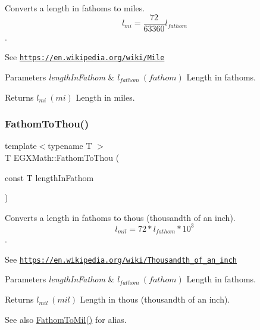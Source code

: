 Converts a length in fathoms to miles. \[ l_{mi}=\frac{72}{63360} l_{fathom} \]. 

See \href{https://en.wikipedia.org/wiki/Mile}{\tt https\+://en.\+wikipedia.\+org/wiki/\+Mile} 
\begin{DoxyParams}{Parameters}
{\em length\+In\+Fathom} & $ l_{fathom}\ (fathom)$ Length in fathoms. \\
\hline
\end{DoxyParams}
\begin{DoxyReturn}{Returns}
$ l_{mi}\ (mi)$ Length in miles. 
\end{DoxyReturn}
\mbox{\label{group___e_g_x_math-_conversions-_length_conversions-_nautical-_fathom-_imperial_ga869f851e88866f34c0dca73f1b69bb21}} 
\subsubsection{\texorpdfstring{Fathom\+To\+Thou()}{FathomToThou()}}
{\footnotesize\ttfamily template$<$typename T $>$ \\
T E\+G\+X\+Math\+::\+Fathom\+To\+Thou (\begin{DoxyParamCaption}\item[{const T}]{length\+In\+Fathom }\end{DoxyParamCaption})}



Converts a length in fathoms to thous (thousandth of an inch). \[ l_{mil}=72 * l_{fathom} * 10^{3} \]. 

See \href{https://en.wikipedia.org/wiki/Thousandth_of_an_inch}{\tt https\+://en.\+wikipedia.\+org/wiki/\+Thousandth\+\_\+of\+\_\+an\+\_\+inch} 
\begin{DoxyParams}{Parameters}
{\em length\+In\+Fathom} & $ l_{fathom}\ (fathom)$ Length in fathoms. \\
\hline
\end{DoxyParams}
\begin{DoxyReturn}{Returns}
$ l_{mil}\ (mil)$ Length in thous (thousandth of an inch). 
\end{DoxyReturn}
\begin{DoxySeeAlso}{See also}
\mbox{\hyperlink{group___e_g_x_math-_conversions-_length_conversions-_nautical-_fathom-_imperial_ga1bdfdd0f208b878241772cc584fa4d1d}{Fathom\+To\+Mil()}} for alias. 
\end{DoxySeeAlso}
\mbox{\label{group___e_g_x_math-_conversions-_length_conversions-_nautical-_fathom-_imperial_ga1f8085825612168639f1db2cd20432cb}} 
